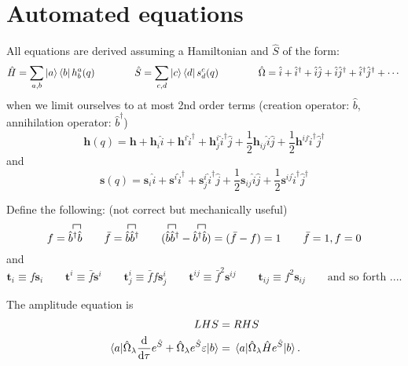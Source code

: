 \documentclass{article}
\newcommand{\bh}{\textbf{h}}
\newcommand{\bs}{\textbf{s}}
\newcommand{\bt}{\textbf{t}}
\newcommand{\up}[1]{\hat{#1}^{\dagger}}
\newcommand{\down}[1]{\hat{#1}}
\begin{document}
%
%
%
%
\section{Automated equations}
All equations are derived assuming a Hamiltonian and $\hat{S}$ of the form:
\begin{equation}
    \hat{H} = \sum_{a,b} \ket{a}\bra{b}h^{a}_{b}(q)
\qquad\qquad
    \hat{S} = \sum_{c,d} \ket{c}\bra{d}s^{c}_{d}(q)
\qquad\qquad
    \hat{\Omega} = \down{i} + \up{i} + \down{i}\down{j} + \down{i}\up{j} + \up{i}\up{j} + \cdots
\end{equation}
when we limit ourselves to at most 2nd order terms (creation operator: $\down{b}$, annihilation operator: $\up{b}$)
\begin{equation}
    \bh(q) = \bh + \bh_{i}\down{i} + \bh^{i}\up{i} + \bh^{i}_{j}\up{i}\down{j} + \frac{1}{2}\bh_{ij}\down{i}\down{j} + \frac{1}{2}\bh^{ij}\up{i}\up{j}
\end{equation}
and
\begin{equation}
    \bs(q) = \bs_{i}\down{i} + \bs^{i}\up{i} + \bs^{i}_{j}\up{i}\down{j} + \frac{1}{2}\bs_{ij}\down{i}\down{j} + \frac{1}{2}\bs^{ij}\up{i}\up{j}
\end{equation}

Define the following: (not correct but mechanically useful)
\begin{equation}
    f = \contraction[1ex]{}{\up{b}}{}{\down{b}}\up{b}\down{b}
\qquad
    \bar{f} = \contraction[1ex]{}{\down{b}}{}{\up{b}}\down{b}\up{b}
\qquad
    (
    \contraction[1ex]{}{\down{b}}{}{\up{b}}\down{b}\up{b}
    -
    \contraction[1ex]{}{\up{b}}{}{\down{b}}\up{b}\down{b}
    )
    = (\bar{f} - f) = 1
\qquad
    \bar{f} = 1, f = 0
\end{equation}
and
\begin{equation}
    \bt_{i} \equiv f\bs_{i}
\qquad
    \bt^{i} \equiv \bar{f}\bs^{i}
\qquad
    \bt^{i}_{j} \equiv \bar{f}f\bs^{i}_{j}
\qquad
    \bt^{ij} \equiv \bar{f}^2\bs^{ij}
\qquad
    \bt_{ij} \equiv f^2\bs_{ij}
\qquad
    \text{and so forth ....}
\end{equation}


The amplitude equation is
\begin{align}
    LHS &= RHS
\\
    \mel{a}{\hat{\Omega}_{\lambda}\dv{\tau}e^{\hat{S}} + \hat{\Omega}_{\lambda}e^{\hat{S}}\varepsilon}{b}
    &= \mel{a}{\hat{\Omega}_{\lambda}\hat{H}e^{\hat{S}}}{b}.
\end{align}

\clearpage
\end{document}
